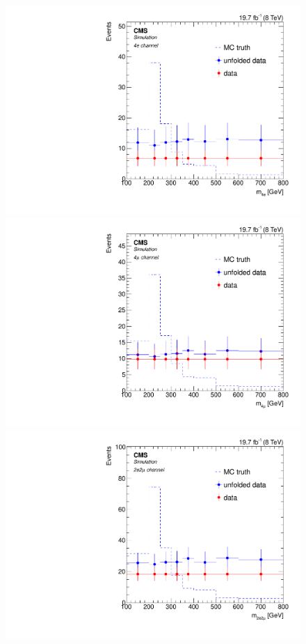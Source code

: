 \begin{figure}[hbtp]
\begin{center}
   \includegraphics[width=0.8\cmsFigWidth]{Figures/Unfolding/MCTests/Biased_Distributions/Mass_ZZTo4e_Pow_fr_bayes_4}     
   \includegraphics[width=0.8\cmsFigWidth]{Figures/Unfolding/MCTests/Biased_Distributions/Mass_ZZTo4m_Pow_fr_bayes_4}     
   \includegraphics[width=0.8\cmsFigWidth]{Figures/Unfolding/MCTests/Biased_Distributions/Mass_ZZTo2e2m_Pow_fr_bayes_4}

\end{center}
\end{figure}
